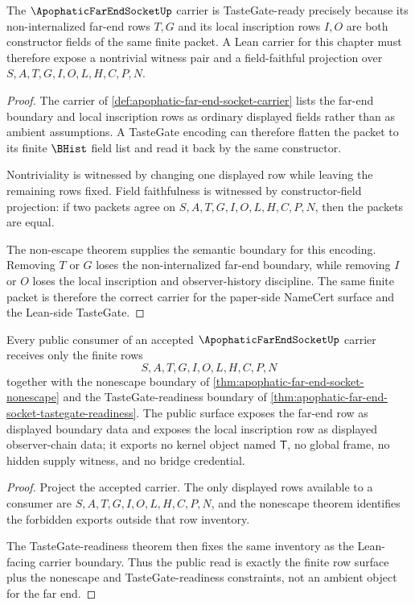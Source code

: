 \begin{theorem}
\label{thm:apophatic-far-end-socket-tastegate-readiness}
The $\ApophaticFarEndSocketUp$ carrier is TasteGate-ready precisely because its non-internalized far-end rows $T,G$ and its local inscription rows $I,O$ are both constructor fields of the same finite packet. A Lean carrier for this chapter must therefore expose a nontrivial witness pair and a field-faithful projection over $S,A,T,G,I,O,L,H,C,P,N$.
\end{theorem}
\begin{proof}
The carrier of \autoref{def:apophatic-far-end-socket-carrier} lists the far-end boundary and local inscription rows as ordinary displayed fields rather than as ambient assumptions. A TasteGate encoding can therefore flatten the packet to its finite $\BHist$ field list and read it back by the same constructor.

Nontriviality is witnessed by changing one displayed row while leaving the remaining rows fixed. Field faithfulness is witnessed by constructor-field projection: if two packets agree on $S,A,T,G,I,O,L,H,C,P,N$, then the packets are equal.

The non-escape theorem supplies the semantic boundary for this encoding. Removing $T$ or $G$ loses the non-internalized far-end boundary, while removing $I$ or $O$ loses the local inscription and observer-history discipline. The same finite packet is therefore the correct carrier for the paper-side NameCert surface and the Lean-side TasteGate.
\end{proof}

\begin{theorem}
\label{thm:apophatic-far-end-socket-public-boundary}
Every public consumer of an accepted $\ApophaticFarEndSocketUp$ carrier receives only the finite rows
$$
S,A,T,G,I,O,L,H,C,P,N
$$
together with the nonescape boundary of \autoref{thm:apophatic-far-end-socket-nonescape} and the TasteGate-readiness boundary of \autoref{thm:apophatic-far-end-socket-tastegate-readiness}. The public surface exposes the far-end row as displayed boundary data and exposes the local inscription row as displayed observer-chain data; it exports no kernel object named $\mathsf{T}$, no global frame, no hidden supply witness, and no bridge credential.
\end{theorem}
\begin{proof}
Project the accepted carrier. The only displayed rows available to a consumer are $S,A,T,G,I,O,L,H,C,P,N$, and the nonescape theorem identifies the forbidden exports outside that row inventory.

The TasteGate-readiness theorem then fixes the same inventory as the Lean-facing carrier boundary. Thus the public read is exactly the finite row surface plus the nonescape and TasteGate-readiness constraints, not an ambient object for the far end.
\end{proof}

